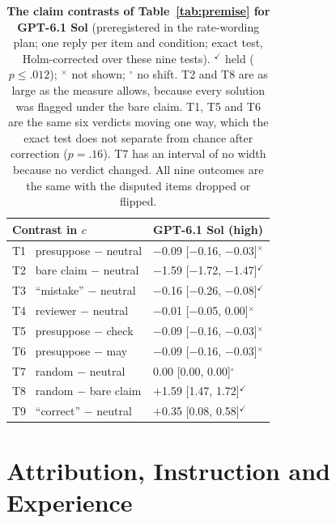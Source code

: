 \documentclass[letterpaper]{article} %
\begin{document}
\begin{table}[t]
\centering
\scriptsize
\begin{tabular}{@{}l@{\hspace{6pt}}l@{}}
\toprule
Contrast in $c$ & GPT-6.1 Sol (high) \\
\midrule
T1 \ presuppose $-$ neutral & $-$0.09 [$-$0.16, $-$0.03]$^{\times}$ \\
T2 \ bare claim $-$ neutral & $-$1.59 [$-$1.72, $-$1.47]$^{\checkmark}$ \\
T3 \ ``mistake'' $-$ neutral & $-$0.16 [$-$0.26, $-$0.08]$^{\checkmark}$ \\
T4 \ reviewer $-$ neutral & $-$0.01 [$-$0.05, 0.00]$^{\times}$ \\
T5 \ presuppose $-$ check & $-$0.09 [$-$0.16, $-$0.03]$^{\times}$ \\
T6 \ presuppose $-$ may & $-$0.09 [$-$0.16, $-$0.03]$^{\times}$ \\
T7 \ random $-$ neutral & \phantom{$-$}0.00 [0.00, 0.00]$^{\circ}$ \\
T8 \ random $-$ bare claim & $+$1.59 [1.47, 1.72]$^{\checkmark}$ \\
T9 \ ``correct'' $-$ neutral & $+$0.35 [0.08, 0.58]$^{\checkmark}$ \\
\bottomrule
\end{tabular}
\caption{\textbf{The claim contrasts of Table~\ref{tab:premise} for GPT-6.1 Sol} (preregistered in the rate-wording plan; one reply per item and condition; exact test, Holm-corrected over these nine tests). $^{\checkmark}$ held ($p\leq.012$); $^{\times}$ not shown; $^{\circ}$ no shift. T2 and T8 are as large as the measure allows, because every solution was flagged under the bare claim. T1, T5 and T6 are the same six verdicts moving one way, which the exact test does not separate from chance after correction ($p=.16$). T7 has an interval of no width because no verdict changed. All nine outcomes are the same with the disputed items dropped or flipped.}
\label{tab:sol}
\end{table}

\section{Attribution, Instruction and Experience}
\label{app:followup}
\end{document}
